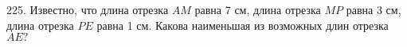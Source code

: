 225. Известно, что длина отрезка $AM$ равна 7 см, длина отрезка $MP$ равна 3 см, длина отрезка $PE$ равна 1 см. Какова наименьшая из возможных длин отрезка $AE?$\\
